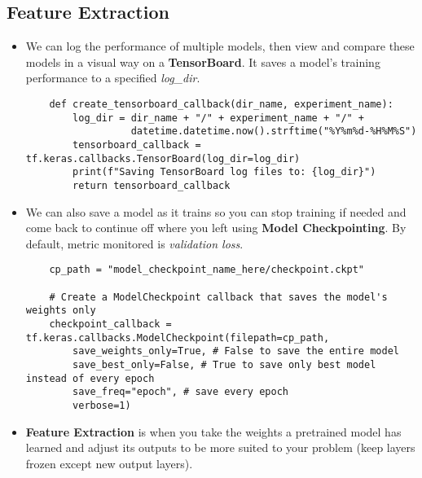 \documentclass[11pt, a4paper]{article}
\begin{document}
	\subsection{Feature Extraction}
	\begin{itemize}
		\item We can log the performance of multiple models, then view and compare these models in a visual way on a \textbf{TensorBoard}. It saves a model's training performance to a specified \textit{log\_dir}.
	\begin{lstlisting}
	def create_tensorboard_callback(dir_name, experiment_name):
		log_dir = dir_name + "/" + experiment_name + "/" +
		          datetime.datetime.now().strftime("%Y%m%d-%H%M%S")
		tensorboard_callback = tf.keras.callbacks.TensorBoard(log_dir=log_dir)
		print(f"Saving TensorBoard log files to: {log_dir}")
		return tensorboard_callback	\end{lstlisting}
		\item We can also save a model as it trains so you can stop training if needed and come back to continue off where you left using \textbf{Model Checkpointing}. By default, metric monitored is \textit{validation loss}.
	\begin{lstlisting}
	cp_path = "model_checkpoint_name_here/checkpoint.ckpt"
	
	# Create a ModelCheckpoint callback that saves the model's weights only
	checkpoint_callback = tf.keras.callbacks.ModelCheckpoint(filepath=cp_path,
		save_weights_only=True, # False to save the entire model
		save_best_only=False, # True to save only best model instead of every epoch 
		save_freq="epoch", # save every epoch
		verbose=1)	\end{lstlisting}
		\item \textbf{Feature Extraction} is when you take the weights a pretrained model has learned and adjust its outputs to be more suited to your problem (keep layers frozen except new output layers).
	\end{itemize} \vspace*{2mm}
\end{document}
